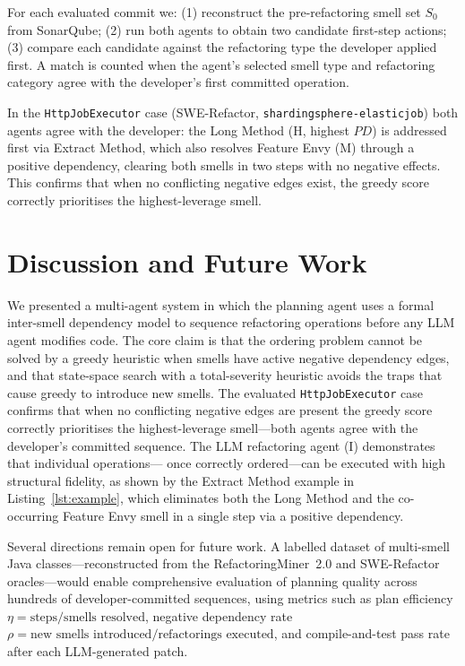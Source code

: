 \documentclass[conference]{IEEEtran}
\begin{document}
For each evaluated commit we: (1) reconstruct the pre-refactoring smell set
$S_0$ from SonarQube; (2) run both agents to obtain two candidate first-step
actions; (3) compare each candidate against the refactoring type the developer
applied first.
A match is counted when the agent's selected smell type and refactoring
category agree with the developer's first committed operation.

In the \texttt{HttpJobExecutor} case (SWE-Refactor,
\texttt{shardingsphere-elasticjob}) both agents agree with the developer:
the Long Method (H, highest $PD$) is addressed first via Extract Method, which
also resolves Feature Envy (M) through a positive dependency, clearing both
smells in two steps with no negative effects.
This confirms that when no conflicting negative edges exist, the greedy score
correctly prioritises the highest-leverage smell.

\section{Discussion and Future Work}

We presented a multi-agent system in which the planning agent uses a formal
inter-smell dependency model to sequence refactoring operations before any
LLM agent modifies code.
The core claim is that the ordering problem cannot be solved by a greedy
heuristic when smells have active negative dependency edges, and that
state-space search with a total-severity heuristic avoids the traps that
cause greedy to introduce new smells.
The evaluated \texttt{HttpJobExecutor} case confirms that when no conflicting
negative edges are present the greedy score correctly prioritises the
highest-leverage smell---both agents agree with the developer's committed
sequence.
The LLM refactoring agent (I) demonstrates that individual operations---
once correctly ordered---can be executed with high structural fidelity, as
shown by the Extract Method example in Listing~\ref{lst:example}, which
eliminates both the Long Method and the co-occurring Feature Envy smell in
a single step via a positive dependency.

Several directions remain open for future work.
A labelled dataset of multi-smell Java classes---reconstructed from the
RefactoringMiner~2.0 and SWE-Refactor oracles---would enable comprehensive
evaluation of planning quality across hundreds of developer-committed
sequences, using metrics such as plan efficiency
$\eta = \text{steps}/\text{smells resolved}$, negative dependency rate
$\rho = \text{new smells introduced}/\text{refactorings executed}$, and
compile-and-test pass rate after each LLM-generated patch.
\end{document}
